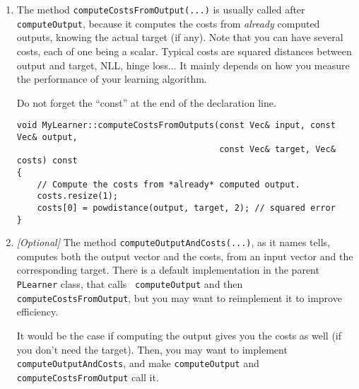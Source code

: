 \documentclass[11pt]{book}
\begin{document}
\begin{enumerate}
\begin{verbatim}
void MyLearner::computeOutput(const Vec& input, Vec& output) const
{
    // Compute the output from the input.
    int nout = outputsize();
    output.resize(nout);

    if( method == 0 )
    {
        tmp += sum(input);
        output << tmp;
    }
    else if( method == 1 )
    {
        output.subVec(0,input.length()) << input;
        output[ inputsize() ] = sum(tmp);
    }
    else if( method == 2 )
    {
        if( inputsize() != 42 )
            PLERROR("MyLearner::computeOutput: inputsize() is '%d', but\n"
                    "Learning method 'second' only works when inputsize() =="
                    " 42.\n", inputsize());
        output.subVec(0,42) << input;
        output.subVec(42,42) << tmp;
    }
}
\end{verbatim}

\item The method {\tt computeCostsFromOutput(...)} is usually called
after {\tt computeOutput}, because it computes the costs from {\em
already} computed outputs, knowing the actual target (if any). Note that
you can have several costs, each of one being a scalar. Typical costs
are squared distances between output and target, NLL, hinge loss...
It mainly depends on how you measure the performance of your learning
algorithm.

Do not forget the “const” at the end of the declaration line.
\begin{verbatim}
void MyLearner::computeCostsFromOutputs(const Vec& input, const Vec& output,
                                        const Vec& target, Vec& costs) const
{
    // Compute the costs from *already* computed output.
    costs.resize(1);
    costs[0] = powdistance(output, target, 2); // squared error
}
\end{verbatim}

\item {\em [Optional]} The method {\tt computeOutputAndCosts(...)},
as it names tells, computes both the output vector and the costs,
from an input vector and the corresponding target. There is a default
implementation in the parent {\tt PLearner} class, that calls {\tt
computeOutput} and then {\tt computeCostsFromOutput}, but you may want
to reimplement it to improve efficiency.

It would be the case if computing the output gives you the costs as
well (if you don't need the target). Then, you may want to implement
{\tt computeOutputAndCosts}, and make {\tt computeOutput} and {\tt
computeCostsFromOutput} call it.


\end{enumerate}
\end{document}
